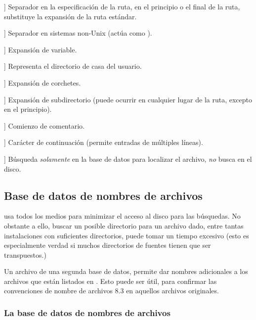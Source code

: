 \documentclass{article}
\begin{document}
\newcommand{\CODE}[1]{\makebox[3em][l]{\code{#1}}}
\begin{ttdescription}
	\item[\CODE{:}] Separador en la especificación de la ruta, en
		el principio o el final de la ruta, substituye la
		expansión de la ruta estándar. \par
	\item[\CODE{;}] Separador en sistemas non-Unix (actúa como
		\code{:}).
	\item[\CODE{\$}] Expansión de variable.
	\item[\CODE{\string~}] Representa el directorio de casa del
		usuario.
	\item[\CODE{\char`\{...\char`\}}] Expansión de corchetes.
	\item[\CODE{//}] Expansión de subdirectorio (puede ocurrir en
		cualquier lugar de la ruta, excepto en el 
		principio).
	\item[\CODE{\%}] Comienzo de comentario.
			\item[\CODE{\bs}] Carácter de
				continuación
				(permite entradas de múltiples
				líneas).
			\item[\CODE{!!}] Búsqueda \emph{solamente} en
				la base de datos para localizar el
				archivo, \emph{no} busca en el disco.
\end{ttdescription}

\subsection{Base de datos de nombres de archivos}
\label{sec:filename-database}

\KPS{} usa todos los medios para minimizar el acceso al disco para las
búsquedas. No obstante a ello, buscar un posible directorio para un
archivo dado, entre tantas instalaciones con suficientes directorios,
puede tomar un tiempo excesivo (esto es especialmente verdad si muchos
directorios de fuentes tienen que ser transpuestos.)

Un archivo  de una segunda base de datos, permite dar
nombres adicionales a los archivos que están listados en .
Esto puede ser útil, para confirmar las convenciones de nombre de
archivos  8.3 en aquellos archivos originales.

\subsubsection{La base de datos de nombres de archivos}
\label{sec:ls-R}
\end{document}
